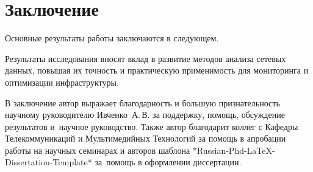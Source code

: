 \chapter*{Заключение}                       %


Основные результаты работы заключаются в следующем.

Результаты исследования вносят вклад в развитие методов анализа сетевых данных, повышая их точность и практическую применимость для мониторинга и оптимизации инфраструктуры.


 В заключение автор выражает благодарность и большую признательность научному руководителю
Ивченко~А.\,В. за поддержку, помощь, обсуждение результатов и~научное руководство. 
Также автор благодарит коллег с Кафедры Телекоммуникаций и Мультимедийных Технологий за помощь в апробации работы на научных семинарах и авторов шаблона
*Russian-Phd-LaTeX-Dissertation-Template* за~помощь в оформлении диссертации. 
